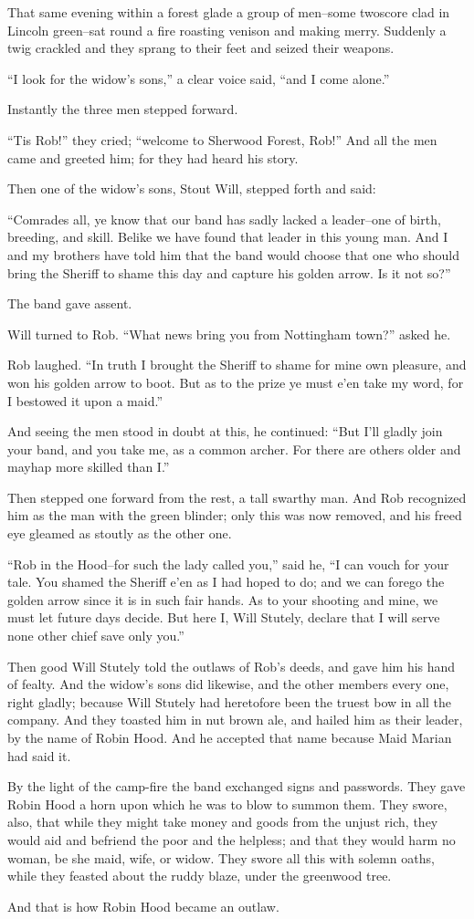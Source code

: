 That same evening within a forest glade a group of men--some twoscore
clad in Lincoln green--sat round a fire roasting venison and making
merry. Suddenly a twig crackled and they sprang to their feet and seized
their weapons.

``I look for the widow's sons,'' a clear voice said, ``and I come
alone.''

Instantly the three men stepped forward.

``Tis Rob!'' they cried; ``welcome to Sherwood Forest, Rob!'' And all
the men came and greeted him; for they had heard his story.

Then one of the widow's sons, Stout Will, stepped forth and said:

``Comrades all, ye know that our band has sadly lacked a leader--one of
birth, breeding, and skill. Belike we have found that leader in this
young man. And I and my brothers have told him that the band would
choose that one who should bring the Sheriff to shame this day and
capture his golden arrow. Is it not so?''

The band gave assent.

Will turned to Rob. ``What news bring you from Nottingham town?'' asked
he.

Rob laughed. ``In truth I brought the Sheriff to shame for mine own
pleasure, and won his golden arrow to boot. But as to the prize ye must
e'en take my word, for I bestowed it upon a maid.''

And seeing the men stood in doubt at this, he continued: ``But I'll
gladly join your band, and you take me, as a common archer. For there
are others older and mayhap more skilled than I.''

Then stepped one forward from the rest, a tall swarthy man. And Rob
recognized him as the man with the green blinder; only this was now
removed, and his freed eye gleamed as stoutly as the other one.

``Rob in the Hood--for such the lady called you,'' said he, ``I can
vouch for your tale. You shamed the Sheriff e'en as I had hoped to do;
and we can forego the golden arrow since it is in such fair hands. As to
your shooting and mine, we must let future days decide. But here I, Will
Stutely, declare that I will serve none other chief save only you.''

Then good Will Stutely told the outlaws of Rob's deeds, and gave him his
hand of fealty. And the widow's sons did likewise, and the other members
every one, right gladly; because Will Stutely had heretofore been the
truest bow in all the company. And they toasted him in nut brown ale,
and hailed him as their leader, by the name of Robin Hood. And he
accepted that name because Maid Marian had said it.

By the light of the camp-fire the band exchanged signs and passwords.
They gave Robin Hood a horn upon which he was to blow to summon them.
They swore, also, that while they might take money and goods from the
unjust rich, they would aid and befriend the poor and the helpless; and
that they would harm no woman, be she maid, wife, or widow. They swore
all this with solemn oaths, while they feasted about the ruddy blaze,
under the greenwood tree.

And that is how Robin Hood became an outlaw.
